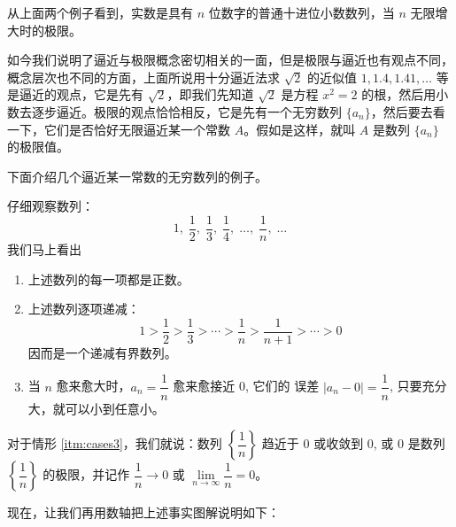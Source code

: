 从上面两个例子看到，实数是具有 $n$ 位数字的普通十进位小数数列，当 $n$ 无限增大时的极限。

如今我们说明了逼近与极限概念密切相关的一面，但是极限与逼近也有观点不同，概念层次也不同的方面，上面所说用十分逼近法求 $\sqrt{2}$ 的近似值 $1,1.4,1.41,\ldots$ 等是逼近的观点，它是先有 $\sqrt{2}$，即我们先知道 $\sqrt{2}$ 是方程 $x^2=2$
的根，然后用小数去逐步逼近。极限的观点恰恰相反，它是先有一个无穷数列 $\{a_n\}$，然后要去看一下，它们是否恰好无限逼近某一个常数 $A$。假如是这样，就叫 $A$ 是数列 $\{a_n\}$ 的极限值。

下面介绍几个逼近某一常数的无穷数列的例子。

\begin{example}\label{exp:harmonic}
  仔细观察数列：
  \[1,\; \frac{1}{2},\;\frac{1}{3},\;\frac{1}{4},\; \ldots,\;\frac{1}{n},\;\ldots\]
我们马上看出
\begin{enumerate}
    \item 上述数列的每一项都是正数。
    \item 上述数列逐项递减：
\[1>\frac{1}{2}>\frac{1}{3}>\cdots>\frac{1}{n}>\frac{1}{n+1}>\cdots>0\]
因而是一个递减有界数列。
\item\label{itm:cases3} 当 $n$ 愈来愈大时，$a_n=\dfrac{1}{n}$ 愈来愈接近 0, 它们的
误差 $|a_n-0|=\dfrac{1}{n}$, 只要充分大，就可以小到任意小。
\end{enumerate}

对于情形 \ref{itm:cases3}，我们就说：数列 $\left\{\dfrac{1}{n}\right\}$ 趋近于 0 或收敛到 0, 或 0 是数列 $\left\{\dfrac{1}{n}\right\}$ 的极限，并记作 $\dfrac{1}{n}\to 0$ 或 $\lim\limits_{n\to\infty}\dfrac{1}{n}=0$。

\medskip
现在，让我们再用数轴把上述事实图解说明如下：
\begin{figure}
    \caption{}
\end{figure}


\end{example}
